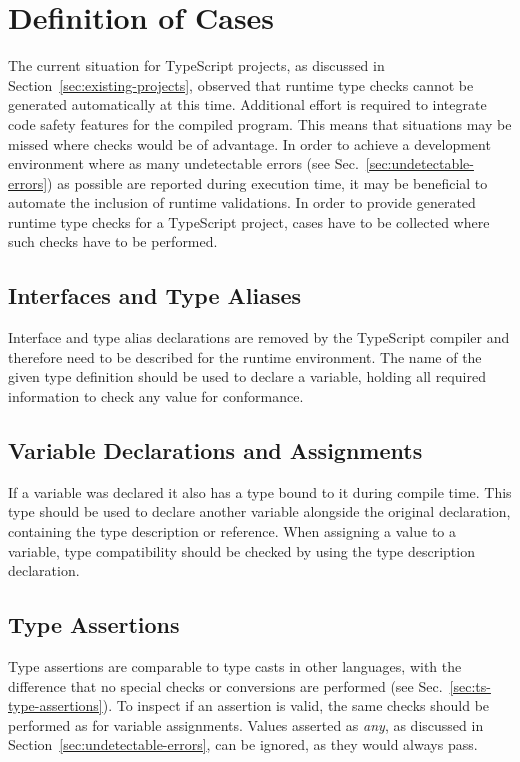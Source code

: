 \section{Definition of Cases}
\label{sec:type-check-situations}

The current situation for TypeScript projects, as discussed in Section~\ref{sec:existing-projects}, observed that runtime type checks cannot be generated automatically at this time. Additional effort is required to integrate code safety features for the compiled program. This means that situations may be missed where checks would be of advantage. In order to achieve a development environment where as many undetectable errors (see Sec.~\ref{sec:undetectable-errors}) as possible are reported during execution time, it may be beneficial to automate the inclusion of runtime validations. In order to provide generated runtime type checks for a TypeScript project, cases have to be collected where such checks have to be performed.

\subsection{Interfaces and Type Aliases}

Interface and type alias declarations are removed by the TypeScript compiler and therefore need to be described for the runtime environment. The name of the given type definition should be used to declare a variable, holding all required information to check any value for conformance.

\subsection{Variable Declarations and Assignments}

If a variable was declared it also has a type bound to it during compile time. This type should be used to declare another variable alongside the original declaration, containing the type description or reference. When assigning a value to a variable, type compatibility should be checked by using the type description declaration.

\subsection{Type Assertions}

Type assertions are comparable to type casts in other languages, with the difference that no special checks or conversions are performed (see Sec.~\ref{sec:ts-type-assertions}). To inspect if an assertion is valid, the same checks should be performed as for variable assignments. Values asserted as \emph{any}, as discussed in Section~\ref{sec:undetectable-errors}, can be ignored, as they would always pass.

